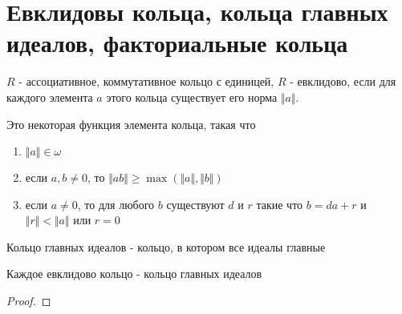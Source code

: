 \documentclass[../main/document.tex]{subfiles}
\begin{document}
\section{Евклидовы кольца, кольца главных идеалов, факториальные кольца}
\begin{dfn}
$R$ - ассоциативное, коммутативное кольцо с единицей, $R$ - евклидово, если для каждого элемента $a$ этого кольца существует его норма $\Vert a\Vert$.
\end{dfn}
\begin{dfn}
Это некоторая функция элемента кольца, такая что
\begin{enumerate}
\item $\Vert a\Vert \in \omega$
\item если $a,b\neq 0$, то $\Vert ab\Vert \geq \max(\Vert a\Vert,\Vert b\Vert)$
\item если $a\neq 0$, то для любого $b$ существуют $d$ и $r$ такие что $b=da+r$ и $\Vert r\Vert < \Vert a\Vert$ или $r=0$
\end{enumerate}
\end{dfn}
\begin{dfn}
Кольцо главных идеалов - кольцо, в котором все идеалы главные
\end{dfn}
\begin{thm}
Каждое евклидово кольцо - кольцо главных идеалов
\begin{proof}

\end{proof}
\end{thm}
\end{document}
